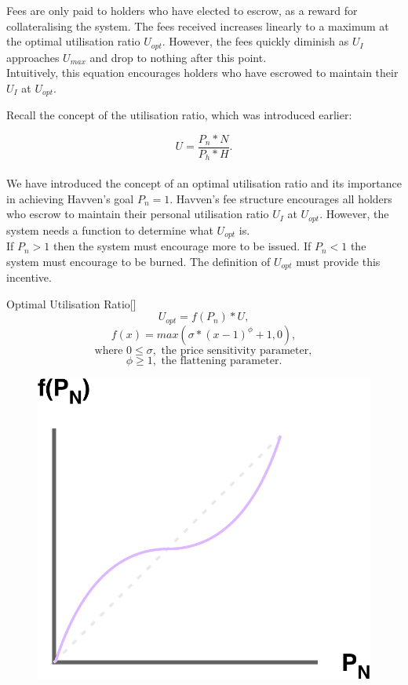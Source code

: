 \noindent Fees are only paid to \HAV{} holders who have elected to escrow, as a reward for collateralising the system. The fees received increases linearly to a maximum at the optimal utilisation ratio $U_{opt}$. However, the fees quickly diminish as $U_I$ approaches $U_{max}$ and drop to nothing after this point. \\

\noindent Intuitively, this equation encourages \HAV{} holders who have escrowed to maintain their $U_I$ at $U_{opt}$. 

\newpage

\noindent Recall the concept of the utilisation ratio, which was introduced earlier:

$$ U = \frac{P_n * N}{P_h * H}. $$ \\

\noindent We have introduced the concept of an optimal utilisation ratio and its importance in achieving Havven's  goal $P_n = 1$. Havven's fee structure encourages all \HAV{} holders who escrow to maintain their personal utilisation ratio $U_I$ at $U_{opt}$. However, the system needs a function to determine what $U_{opt}$ is. \\

\noindent If $P_n > 1$ then the system must encourage more \NOM{} to be issued. If $P_n < 1$ the system must encourage \NOM{} to be burned. The definition of $U_{opt}$ must provide this incentive. \\

\begin{namedthm}{Optimal Utilisation Ratio}[]
$$ U_{opt} = f(P_n) * U,$$
$$ f(x) = max(\sigma * (x - 1)^{\phi} + 1, 0), $$
$$\text{where } 0 \leq \sigma, \text{ the price sensitivity parameter}, $$
$$\phi \geq 1, \text{ the flattening parameter}. $$
\end{namedthm}

\begin{figure}[h!]
    \centering
    \includegraphics[width=.5\textwidth]{img/U_opt}
\end{figure}

